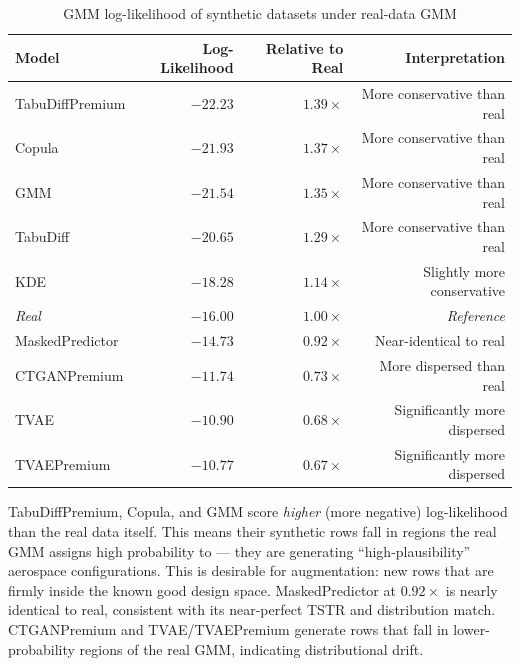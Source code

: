 \documentclass[12pt,a4paper]{article}
\begin{document}
\begin{table}[H]
\centering
\caption{GMM log-likelihood of synthetic datasets under real-data GMM}
\label{tab:gmm_ll}
\renewcommand{\arraystretch}{1.25}
\begin{tabular}{lrrr}
\toprule
\textbf{Model} & \textbf{Log-Likelihood} & \textbf{Relative to Real} & \textbf{Interpretation} \\
\midrule
TabuDiffPremium & $-22.23$ & $1.39\times$ & More conservative than real \\
Copula          & $-21.93$ & $1.37\times$ & More conservative than real \\
GMM             & $-21.54$ & $1.35\times$ & More conservative than real \\
TabuDiff        & $-20.65$ & $1.29\times$ & More conservative than real \\
KDE             & $-18.28$ & $1.14\times$ & Slightly more conservative \\
\textit{Real}   & $-16.00$ & $1.00\times$ & \textit{Reference} \\
MaskedPredictor & $-14.73$ & $0.92\times$ & Near-identical to real \\
CTGANPremium    & $-11.74$ & $0.73\times$ & More dispersed than real \\
TVAE            & $-10.90$ & $0.68\times$ & Significantly more dispersed \\
TVAEPremium     & $-10.77$ & $0.67\times$ & Significantly more dispersed \\
\bottomrule
\end{tabular}
\end{table}

\begin{tcolorbox}[insightbox, title={Interpreting Scores Above Real}]
TabuDiffPremium, Copula, and GMM score \emph{higher} (more negative) log-likelihood than the real data itself. This means their synthetic rows fall in regions the real GMM assigns high probability to --- they are generating ``high-plausibility'' aerospace configurations. This is desirable for augmentation: new rows that are firmly inside the known good design space. MaskedPredictor at $0.92\times$ is nearly identical to real, consistent with its near-perfect TSTR and distribution match. CTGANPremium and TVAE/TVAEPremium generate rows that fall in lower-probability regions of the real GMM, indicating distributional drift.
\end{tcolorbox}

\end{document}
